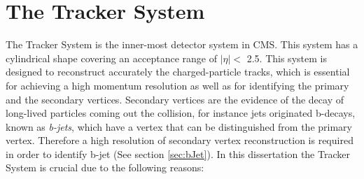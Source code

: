 

\section{The Tracker System}
\label{sec:Tracker}

The Tracker System is the inner-most detector system in CMS. This system has 
a cylindrical shape covering an acceptance range of $|\eta| < $ 2.5. This system is 
designed to reconstruct accurately the charged-particle tracks, which is essential 
for achieving a high momentum resolution as well as for identifying the primary and the 
secondary vertices. Secondary vertices are the evidence of the decay 
of long-lived particles coming out the collision, for instance 
jets originated b-decays, known as \textit{b-jets}, which have a vertex 
that can be distinguished from the primary vertex. Therefore 
a high resolution of secondary vertex reconstruction is required in order to 
identify b-jet (See section \ref{sec:bJet}). In this dissertation the 
Tracker System is crucial due to the following reasons:


